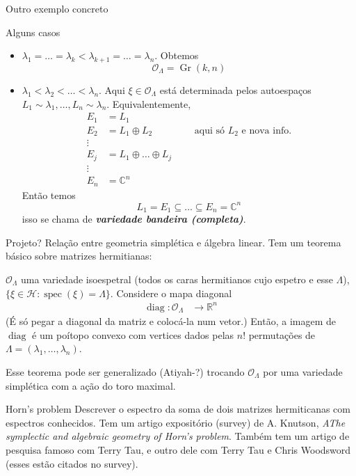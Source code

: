 \begin{idea6}{Outro exemplo concreto}
\begin{idea3}{Alguns casos}
\begin{itemize}
	\item $\lambda_1=\ldots =\lambda_k<\lambda_{k+1}=\ldots =\lambda_n$. Obtemos
		\[\mathcal{O}_\Lambda=\operatorname{Gr}(k,n)\]
	\item $\lambda_1<\lambda_2<\ldots <\lambda_n$. Aqui $\xi \in\mathcal{O}_\Lambda$ está determinada pelos autoespaços $L_1\sim\lambda_1,\ldots,L_n\sim\lambda_n$. Equivalentemente,
		\begin{align*}
			E_1&=L_1\\
			E_2&=L_1\oplus L_2\qquad \qquad \text{ aqui só $L_2$ e nova info.}\\
			\vdots \\
			E_j&=L_1\oplus \ldots \oplus L_j\\
			\vdots \\
			E_n&=\mathbb{C}^n
		\end{align*}
		Então temos
		 \[L_1=E_1\subseteq\ldots \subseteq E_n=\mathbb{C}^{n}\]
		isso se chama de \textit{\textbf{variedade bandeira (completa)}}.
	\end{itemize}
\end{idea3}
\end{idea6}

\begin{idea1}{Projeto?}\leavevmode
	Relação entre geometria simplética e álgebra linear. Tem um teorema básico sobre matrizes hermitianas:
	\begin{thm}\leavevmode
		$\mathcal{O}_\Lambda$ uma variedade isoespetral (todos os caras hermitianos cujo espetro e esse $\Lambda$), $\{\xi \in\mathcal{H}:\operatorname{s pec}(\xi)=\Lambda\}$.
		Considere o mapa diagonal
		\begin{align*}
			\operatorname{diag}: \mathcal{O}_\Lambda &\longrightarrow \mathbb{R}^{n}
		\end{align*}
		(É só pegar a diagonal da matriz e colocá-la num vetor.) Então, a imagem de $\operatorname{diag}$ é um poítopo convexo com vertices dados pelas $n!$ permutações  de $\Lambda=(\lambda_1,\ldots,\lambda_n)$.
	\end{thm}
	\begin{remark}
		Esse teorema pode ser generalizado (Atiyah-?) trocando $\mathcal{O}_\Lambda$ por uma variedade simplética com a ação do toro maximal.
	\end{remark}
	\begin{idea3}{Horn's problem}\leavevmode
		Descrever o espectro da soma de dois matrizes hermiticanas com espectros conhecidos. Tem um artigo expositório (survey) de A. Knutson, \textit{AThe symplectic and algebraic geometry of Horn's problem}. Também tem um artigo de pesquisa famoso com Terry Tau, e outro dele com Terry Tau e Chris Woodsword (esses estão citados no survey).
	\end{idea3}
\end{idea1}

